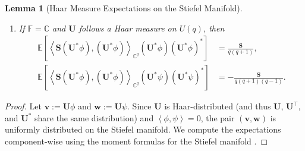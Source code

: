 \documentclass[noinfoline]{imsart}\setcounter{tocdepth}{2}
\renewcommand{\b}[1]{\mathbb{#1}} %
\newcommand{\m}[1]{\mathbf{#1}} %
\newcommand{\innpr}[2]{{\left\langle {#1},{#2}\right\rangle}} %
\theoremstyle{plain}
\newtheorem{lemma}[theorem]{Lemma}
\begin{document}
\begin{appendix}
\begin{lemma}[Haar Measure Expectations on the Stiefel Manifold]
\begin{enumerate}
\item If $\b{F} = \b{C}$ and $\m{U}$ follows a Haar measure on $U(q)$, then
\begin{align*}
    \b{E}\left[\innpr{\m{S} (\m{U}^{*} \phi)}{(\m{U}^{*} \phi)}_{\b{C}^{q}} (\m{U}^{*} \phi) (\m{U}^{*} \phi)^{*}\right] &= \frac{\m{S}}{q(q+1)}, \\
    \b{E}\left[\innpr{\m{S} (\m{U}^{*} \phi)}{(\m{U}^{*} \phi)}_{\b{C}^{q}} (\m{U}^{*} \psi) (\m{U}^{*} \psi)^{*}\right] &= - \frac{\m{S}}{q(q+1)(q-1)}.
\end{align*}
\end{enumerate}
\end{lemma}

\begin{proof}
Let $\m{v} := \m{U} \phi$ and $\m{w} := \m{U} \psi$. Since $\m{U}$ is Haar-distributed (and thus $\m{U}$, $\m{U}^\top$, and $\m{U}^*$ share the same distribution) and $\innpr{\phi}{\psi}=0$, the pair $(\m{v}, \m{w})$ is uniformly distributed on the Stiefel manifold. We compute the expectations component-wise using the moment formulas for the Stiefel manifold \cite{collins2006integration}.


\end{proof}
\end{appendix}
\end{document}
